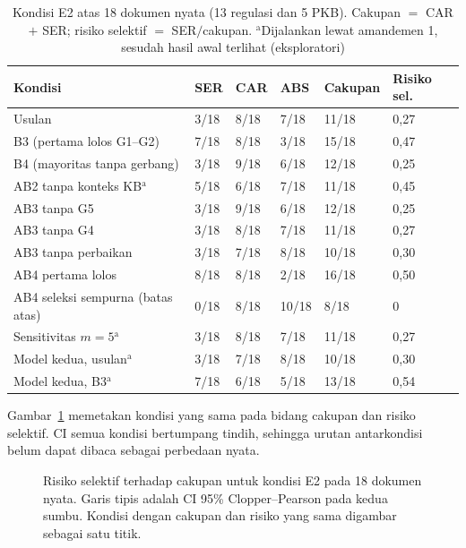 \documentclass[conference]{IEEEtran}
\begin{document}
\begin{table}[t]
\centering
\caption{Kondisi E2 atas 18 dokumen nyata (13 regulasi dan 5 PKB). Cakupan $=$ CAR $+$ SER; risiko selektif $=$ SER$/$cakupan. $^{\mathrm{a}}$Dijalankan lewat amandemen 1, sesudah hasil awal terlihat (eksploratori)}
\label{tab:e2}
\scriptsize
\setlength{\tabcolsep}{3pt}
\begin{tabularx}{\columnwidth}{@{}L P{0.6cm} P{0.6cm} P{0.6cm} P{1.0cm} P{0.85cm}@{}}
\toprule
\textbf{Kondisi} & \textbf{SER} & \textbf{CAR} & \textbf{ABS} & \textbf{Cakupan} & \textbf{Risiko sel.} \\
\midrule
Usulan & 3/18 & 8/18 & 7/18 & 11/18 & 0,27 \\
B3 (pertama lolos G1--G2) & 7/18 & 8/18 & 3/18 & 15/18 & 0,47 \\
B4 (mayoritas tanpa gerbang) & 3/18 & 9/18 & 6/18 & 12/18 & 0,25 \\
\midrule
AB2 tanpa konteks KB$^{\mathrm{a}}$ & 5/18 & 6/18 & 7/18 & 11/18 & 0,45 \\
AB3 tanpa G5 & 3/18 & 9/18 & 6/18 & 12/18 & 0,25 \\
AB3 tanpa G4 & 3/18 & 8/18 & 7/18 & 11/18 & 0,27 \\
AB3 tanpa perbaikan & 3/18 & 7/18 & 8/18 & 10/18 & 0,30 \\
AB4 pertama lolos & 8/18 & 8/18 & 2/18 & 16/18 & 0,50 \\
AB4 seleksi sempurna (batas atas) & 0/18 & 8/18 & 10/18 & 8/18 & 0 \\
\midrule
Sensitivitas $m = 5$$^{\mathrm{a}}$ & 3/18 & 8/18 & 7/18 & 11/18 & 0,27 \\
Model kedua, usulan$^{\mathrm{a}}$ & 3/18 & 7/18 & 8/18 & 10/18 & 0,30 \\
Model kedua, B3$^{\mathrm{a}}$ & 7/18 & 6/18 & 5/18 & 13/18 & 0,54 \\
\bottomrule
\end{tabularx}
\end{table}

Gambar~\ref{fig:rq2} memetakan kondisi yang sama pada bidang cakupan dan risiko selektif. CI semua kondisi bertumpang tindih, sehingga urutan antarkondisi belum dapat dibaca sebagai perbedaan nyata.

\begin{figure}[t]
\centering

\caption{Risiko selektif terhadap cakupan untuk kondisi E2 pada 18 dokumen nyata. Garis tipis adalah CI 95\% Clopper--Pearson pada kedua sumbu. Kondisi dengan cakupan dan risiko yang sama digambar sebagai satu titik.}
\label{fig:rq2}
\end{figure}
\end{document}
